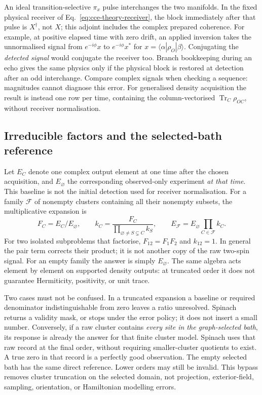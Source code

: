 \documentclass[11pt,a4paper]{article}
\newcommand{\Tr}{\operatorname{Tr}}
\begin{document}
An ideal transition-selective $\pi_x$ pulse interchanges the two
manifolds. In the fixed physical receiver of Eq.~\eqref{eq:cce-theory-receiver},
the block immediately after that pulse is $X^\dagger$, not $X$; this
adjoint includes the complex prepared coherence. For example, at positive
elapsed time with zero drift, an applied inversion takes the unnormalised signal from
$e^{-i\phi}x$ to $e^{-i\phi}x^*$ for $x=\langle\alpha|\rho_O|\beta\rangle$.
Conjugating the \emph{detected signal} would conjugate the receiver too.
Branch bookkeeping during an echo gives the same physics only if the
physical block is restored at detection after an odd interchange. Compare
complex signals when checking a sequence: magnitudes cannot diagnose this
error. For generalised density acquisition the result is instead one row
per time, containing the column-vectorised $\Tr_C\rho_{OC}$, without
receiver normalisation.

\subsection{Irreducible factors and the selected-bath reference}

Let $E_C$ denote one complex output element at one time after the chosen
acquisition, and $E_\varnothing$ the corresponding observed-only
experiment \emph{at that time}. This baseline is not the initial
detection used for receiver normalisation. For a family $\mathcal F$
of nonempty clusters containing all their nonempty subsets, the
multiplicative expansion is~\cite{cce-theory-yang08}
\begin{equation}
 F_C=E_C/E_\varnothing,\qquad
 k_C=\frac{F_C}{\prod_{\varnothing\ne S\subsetneq C} k_S},\qquad
 E_{\mathcal F}=E_\varnothing\prod_{C\in\mathcal F}k_C.
 \label{eq:cce-theory-recursion}
\end{equation}
For two isolated subproblems that factorise, $F_{12}=F_1 F_2$ and
$k_{12}=1$. In general the pair term corrects their product; it is not
another copy of the raw two-spin signal. For an empty family the answer
is simply $E_\varnothing$. The same algebra acts element by element on
supported density outputs: at truncated order it does not guarantee
Hermiticity, positivity, or unit trace.

Two cases must not be confused. In a truncated expansion a baseline or
required denominator indistinguishable from zero leaves a ratio
unresolved. Spinach returns a validity mask, or stops under the error
policy; it does not insert a small number. Conversely, if a raw cluster
contains \emph{every site in the graph-selected bath}, its response is
already the answer for that finite cluster model. Spinach uses that raw
record at the final order, without requiring smaller-cluster quotients to
exist. A true zero in that record is a perfectly good observation. The
empty selected bath has the same direct reference. Lower orders may
still be invalid. This bypass removes cluster truncation on the selected
domain, not projection, exterior-field, sampling, orientation, or
Hamiltonian modelling errors.
\end{document}
